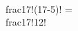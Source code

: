 \documentclass[preview]{standalone}
\begin{document}
\begin{center}
\quad\\frac{17!}{(17-5)!} = \quad\\frac{17!}{12!}
\end{center}
\end{document}
